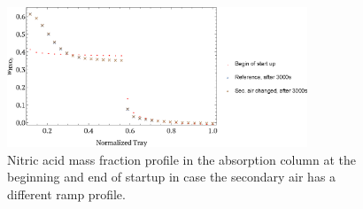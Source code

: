\documentclass[journal=jacsat,manuscript=article]{achemso}
\begin{document}
\begin{figure}[htb]
	\centering
	\includegraphics[width=0.8\textwidth]{figure6sp.eps}
	\caption{Nitric acid mass fraction profile in the absorption column at the beginning and end of startup in case the secondary air has a different ramp profile.} 	
	\label{fig:startairperfil}
\end{figure}







\end{document}
